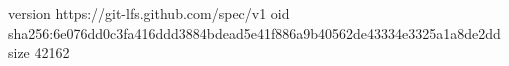version https://git-lfs.github.com/spec/v1
oid sha256:6e076dd0c3fa416ddd3884bdead5e41f886a9b40562de43334e3325a1a8de2dd
size 42162
